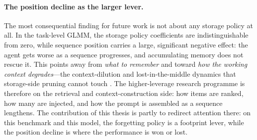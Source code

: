 \paragraph{The position decline as the larger lever.}
The most consequential finding for future work is not about any storage policy at all. In the task-level GLMM, the storage policy coefficients are indistinguishable from zero, while sequence position carries a large, significant negative effect: the agent gets worse as a sequence progresses, and accumulating memory does not rescue it. This points away from \emph{what to remember} and toward \emph{how the working context degrades}---the context-dilution and lost-in-the-middle dynamics that storage-side pruning cannot touch \citep{liu2024}. The higher-leverage research programme is therefore on the retrieval and context-construction side: how items are ranked, how many are injected, and how the prompt is assembled as a sequence lengthens. The contribution of this thesis is partly to redirect attention there: on this benchmark and this model, the forgetting policy is a footprint lever, while the position decline is where the performance is won or lost.
